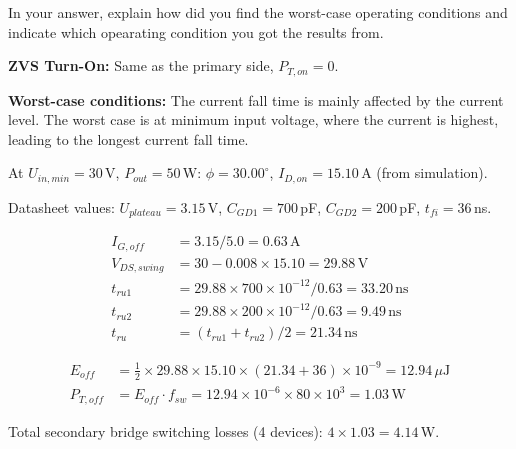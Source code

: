 \documentclass{PELsmallreport}
\begin{document}
In your answer, explain how did you find the worst-case operating conditions and indicate which opearating condition you got the results from.
\begin{framed}
	\vspace{2em}
  \textbf{ZVS Turn-On:} Same as the primary side, $P_{T,on} = 0$.
 
\textbf{Worst-case conditions:} The current fall time is mainly affected by the current level. The worst case is at minimum input voltage, where the current is highest, leading to the longest current fall time.
 
At $U_{in,min} = 30$\,V, $P_{out} = 50$\,W: $\phi = 30.00^\circ$, $I_{D,on} = 15.10$\,A (from simulation).
 
Datasheet values: $U_{plateau} = 3.15$\,V, $C_{GD1} = 700$\,pF, $C_{GD2} = 200$\,pF, $t_{fi} = 36$\,ns.
 
\begin{align}
    I_{G,off} &= 3.15 / 5.0 = 0.63\,\text{A} \\
    V_{DS,swing} &= 30 - 0.008 \times 15.10 = 29.88\,\text{V} \\
    t_{ru1} &= 29.88 \times 700\times10^{-12} / 0.63 = 33.20\,\text{ns} \\
    t_{ru2} &= 29.88 \times 200\times10^{-12} / 0.63 = 9.49\,\text{ns} \\
    t_{ru} &= (t_{ru1} + t_{ru2})/2 = 21.34\,\text{ns}
\end{align}
 
\begin{align}
    E_{off} &= \frac{1}{2}\times 29.88 \times 15.10 \times (21.34 + 36)\times10^{-9} = 12.94\,\mu\text{J} \\
    P_{T,off} &= E_{off}\cdot f_{sw} = 12.94\times10^{-6}\times 80\times10^3 = 1.03\,\text{W}
\end{align}

Total secondary bridge switching losses (4 devices): $4 \times 1.03 = 4.14$\,W.
  
    \vspace{2em}
\end{framed}

 \quad
{}
\hfill{}
\end{document}
